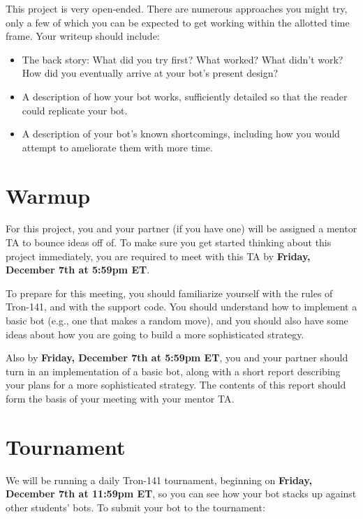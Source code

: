 \documentclass{article}
\begin{document}
This project is very open-ended.  There are numerous approaches you
might try, only a few of which you can be expected to get working
within the allotted time frame.  Your writeup should include:

\begin{itemize}
\item The back story: What did you try first?  What worked?  What
  didn't work?  How did you eventually arrive at your bot's present
  design?
  
\item A description of how your bot works, sufficiently detailed so
  that the reader could replicate your bot.

\item A description of your bot's known shortcomings, including how
  you would attempt to ameliorate them with more time.
\end{itemize}


\section{Warmup}
For this project, you and your partner (if you have one) will be
assigned a mentor TA to bounce ideas off of.  To make sure you get
started thinking about this project immediately, you are required to
meet with this TA by \textbf{Friday, December 7th at 5:59pm ET}.

To prepare for this meeting, you should familiarize yourself with the
rules of Tron-141, and with the support code.  You should understand
how to implement a basic bot (e.g., one that makes a random move), and
you should also have some ideas about how you are going to build a
more sophisticated strategy.

Also by \textbf{Friday, December 7th at 5:59pm ET}, you and your
partner should turn in an implementation of a basic bot, along with a
short report describing your plans for a more sophisticated strategy.
The contents of this report should form the basis of your meeting with
your mentor TA.


\section{Tournament}
We will be running a daily Tron-141 tournament, beginning on
\textbf{Friday, December 7th at 11:59pm ET}, so you can see how your
bot stacks up against other students' bots.  To submit your bot to the
tournament:
\end{document}
